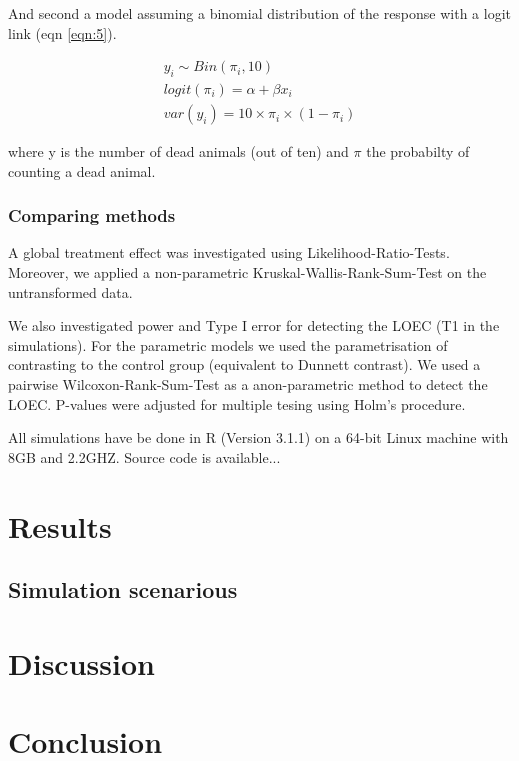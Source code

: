 \documentclass{scrartcl}\usepackage[]{graphicx}\usepackage[]{color}
\begin{document}
And second a model assuming a binomial distribution of the response with a logit link (eqn \ref{eqn:5}).

\begin{align}
  y_i \sim Bin(\pi_i, 10) \nonumber \\
  logit(\pi_i) = \alpha + \beta x_i \label{eqn:5} \\
  var(y_i) = 10 \times \pi_i \times (1 - \pi_i) \nonumber
\end{align}

where y is the number of dead animals (out of ten) and $\pi$ the probabilty of counting a dead animal.

\subsubsection{Comparing methods}
A global treatment effect was investigated using Likelihood-Ratio-Tests.
Moreover, we applied a non-parametric Kruskal-Wallis-Rank-Sum-Test on the untransformed data.

We also investigated power and Type I error for detecting the LOEC (T1 in the simulations).
For the parametric models we used the parametrisation of contrasting to the control group (equivalent to Dunnett contrast).
We used a pairwise Wilcoxon-Rank-Sum-Test as a anon-parametric method to detect the LOEC.
P-values were adjusted for multiple tesing using Holm's procedure.

All simulations have be done in R (Version 3.1.1) on a 64-bit Linux machine with 8GB and 2.2GHZ.
Source code is available... 



\section{Results}
\subsection{Simulation scenarious}



\section{Discussion}


\section{Conclusion}




\end{document}
